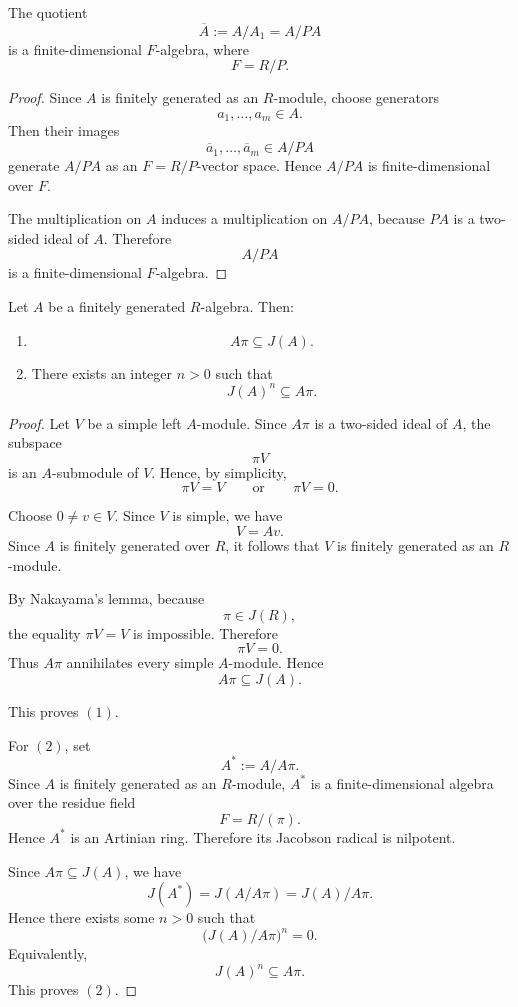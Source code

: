 \begin{proposition}
    The quotient
    \[
        \overline{A}:=A/A_1=A/PA
    \]
    is a finite-dimensional \(F\)-algebra, where
    \[
        F=R/P.
    \]
\end{proposition}

\begin{proof}
    Since \(A\) is finitely generated as an \(R\)-module, choose generators
    \[
        a_1,\dots,a_m\in A.
    \]
    Then their images
    \[
        \overline{a}_1,\dots,\overline{a}_m\in A/PA
    \]
    generate \(A/PA\) as an \(F=R/P\)-vector space. Hence \(A/PA\) is finite-dimensional
    over \(F\).

    The multiplication on \(A\) induces a multiplication on \(A/PA\), because \(PA\) is
    a two-sided ideal of \(A\). Therefore
    \[
        A/PA
    \]
    is a finite-dimensional \(F\)-algebra.
\end{proof}

\begin{theorem}
    Let \(A\) be a finitely generated \(R\)-algebra. Then:
    \begin{enumerate}
        \item
        \[
            A\pi \subseteq J(A).
        \]
        \item There exists an integer \(n>0\) such that
        \[
            J(A)^n \subseteq A\pi.
        \]
    \end{enumerate}
\end{theorem}

\begin{proof}
    Let \(V\) be a simple left \(A\)-module. Since \(A\pi\) is a two-sided ideal of
    \(A\), the subspace
    \[
        \pi V
    \]
    is an \(A\)-submodule of \(V\). Hence, by simplicity,
    \[
        \pi V=V
        \qquad\text{or}\qquad
        \pi V=0.
    \]

    Choose \(0\neq v\in V\). Since \(V\) is simple, we have
    \[
        V=Av.
    \]
    Since \(A\) is finitely generated over \(R\), it follows that \(V\) is finitely
    generated as an \(R\)-module.

    By Nakayama's lemma, because
    \[
        \pi\in J(R),
    \]
    the equality \(\pi V=V\) is impossible. Therefore
    \[
        \pi V=0.
    \]
    Thus \(A\pi\) annihilates every simple \(A\)-module. Hence
    \[
        A\pi \subseteq J(A).
    \]

    This proves \((1)\).

    For \((2)\), set
    \[
        A^\ast := A/A\pi.
    \]
    Since \(A\) is finitely generated as an \(R\)-module, \(A^\ast\) is a finite-dimensional
    algebra over the residue field
    \[
        F=R/(\pi).
    \]
    Hence \(A^\ast\) is an Artinian ring. Therefore its Jacobson radical is nilpotent.

    Since \(A\pi\subseteq J(A)\), we have
    \[
        J(A^\ast)=J(A/A\pi)=J(A)/A\pi.
    \]
    Hence there exists some \(n>0\) such that
    \[
        \bigl(J(A)/A\pi\bigr)^n=0.
    \]
    Equivalently,
    \[
        J(A)^n\subseteq A\pi.
    \]
    This proves \((2)\).
\end{proof}

